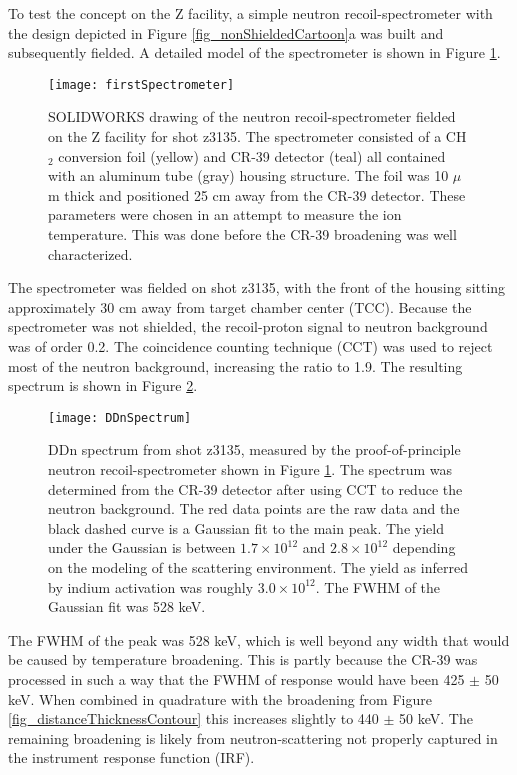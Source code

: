 To test the concept on the Z facility, a simple neutron recoil-spectrometer with the design depicted in Figure \ref{fig_nonShieldedCartoon}a was built and subsequently fielded. A detailed model of the spectrometer is shown in Figure \ref{fig_firstSpectrometer}.

\begin{figure}[h!]
	
	\centering
	\texttt{[image: firstSpectrometer]}
	\caption{SOLIDWORKS drawing of the neutron recoil-spectrometer fielded on the Z facility for shot z3135. The spectrometer consisted of a CH$_2$ conversion foil (yellow) and CR-39 detector (teal) all contained with an aluminum tube (gray) housing structure. The foil was 10 $\mu$m thick and positioned 25 cm away from the CR-39 detector. These parameters were chosen in an attempt to measure the ion temperature. This was done before the CR-39 broadening was well characterized.}
	\label{fig_firstSpectrometer}
	
\end{figure}

The spectrometer was fielded on shot z3135, with the front of the housing sitting approximately 30 cm away from target chamber center (TCC). Because the spectrometer was not shielded, the recoil-proton signal to neutron background was of order 0.2. The coincidence counting technique (CCT) \cite{Lahmann_RSI_2016, Casey_RSI_2011} was used to reject most of the neutron background, increasing the ratio to 1.9. The resulting spectrum is shown in Figure \ref{fig_DDnSpectrum}.  

\begin{figure}[h!]
	
	\centering
	\texttt{[image: DDnSpectrum]}
	\caption{DDn spectrum from shot z3135, measured by the proof-of-principle neutron recoil-spectrometer shown in Figure \ref{fig_firstSpectrometer}. The spectrum was determined from the CR-39 detector after using CCT to reduce the neutron background. The red data points are the raw data and the black dashed curve is a Gaussian fit to the main peak. The yield under the Gaussian is between $1.7\times10^{12}$ and $2.8\times10^{12}$ depending on the modeling of the scattering environment. The yield as inferred by indium activation was roughly $3.0\times10^{12}$. The FWHM of the Gaussian fit was 528 keV.}
	\label{fig_DDnSpectrum}
	
\end{figure}

The FWHM of the peak was 528 keV, which is well beyond any width that would be caused by temperature broadening. This is partly because the CR-39 was processed in such a way that the FWHM of response would have been 425 $\pm$ 50 keV. When combined in quadrature with the broadening from Figure \ref{fig_distanceThicknessContour} this increases slightly to 440 $\pm$ 50 keV. The remaining broadening is likely from neutron-scattering not properly captured in the instrument response function (IRF).

